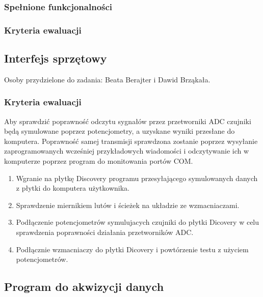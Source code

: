 \documentclass{article}
\begin{document}
\subsubsection{Spełnione funkcjonalności}

\subsubsection{Kryteria ewaluacji}


\subsection{Interfejs sprzętowy}

Osoby przydzielone do zadania: Beata Berajter i Dawid Brząkała. \\



\subsubsection{Kryteria ewaluacji}
Aby sprawdzić poprawność odczytu sygnałów przez przetworniki ADC czujniki będą symulowane poprzez potencjometry, a uzyskane wyniki przesłane do komputera. Poprawność samej transmisji sprawdzona zostanie poprzez wysyłanie zaprogramowanych wcześniej przykładowych wiadomości i odczytywanie ich w komputerze poprzez program do monitowania portów COM.

\begin{enumerate}
	\item Wgranie na płytkę Discovery programu przesyłającego symulowanych danych z płytki do komputera użytkownika.
	\item Sprawdzenie miernikiem lutów i ścieżek na układzie ze wzmacniaczami.
	\item Podłączenie potencjometrów symulujacych czujniki do płytki Dicovery w celu sprawdzenia poprawności działania przetworników ADC.
	\item Podłącznie wzmacniaczy do płytki Dicovery i powtórzenie testu z użyciem potencjometrów.
\end{enumerate}


\subsection{Program do akwizycji danych}
\end{document}
